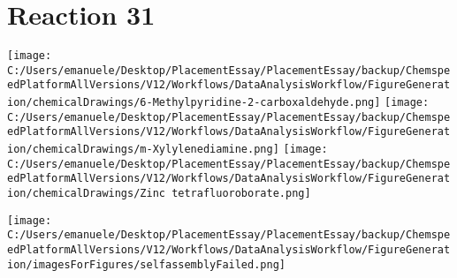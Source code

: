 \documentclass{article}%
\begin{document}
\section*{Reaction 31}%
%
\begin{scheme}[H]%
\begin{minipage}{0.5\textwidth}%
\texttt{[image: C:/Users/emanuele/Desktop/PlacementEssay/PlacementEssay/backup/ChemspeedPlatformAllVersions/V12/Workflows/DataAnalysisWorkflow/FigureGeneration/chemicalDrawings/6-Methylpyridine-2-carboxaldehyde.png]}%
\texttt{[image: C:/Users/emanuele/Desktop/PlacementEssay/PlacementEssay/backup/ChemspeedPlatformAllVersions/V12/Workflows/DataAnalysisWorkflow/FigureGeneration/chemicalDrawings/m-Xylylenediamine.png]}%
\texttt{[image: C:/Users/emanuele/Desktop/PlacementEssay/PlacementEssay/backup/ChemspeedPlatformAllVersions/V12/Workflows/DataAnalysisWorkflow/FigureGeneration/chemicalDrawings/Zinc tetrafluoroborate.png]}%
\end{minipage}%
\begin{minipage}{0.5\textwidth}%
\begin{center}%
\texttt{[image: C:/Users/emanuele/Desktop/PlacementEssay/PlacementEssay/backup/ChemspeedPlatformAllVersions/V12/Workflows/DataAnalysisWorkflow/FigureGeneration/imagesForFigures/selfassemblyFailed.png]}%
\end{center}%
\end{minipage}%
\caption{Self-assembly of components 8, 18, with Zinc(II) in a 3.0:1.5:1.0 molar ratio in CH$_3$CN at 60\textdegree C for 40h. These are the reagents (starting materials) for reaction 31.}%
\end{scheme}%
\end{document}
